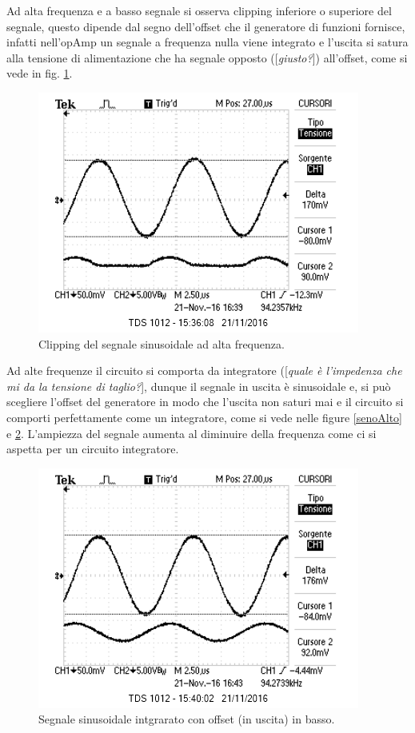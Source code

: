 \documentclass[10pt,a4paper]{article}
\newcommand{\rem}[1]{[\emph{#1}]}
\begin{document}
Ad alta frequenza e a basso segnale si osserva clipping inferiore o superiore del segnale, questo dipende dal segno dell'offset che il generatore di funzioni fornisce, infatti nell'opAmp un segnale a frequenza nulla viene integrato e l'uscita si satura alla tensione di alimentazione che ha segnale opposto (\rem{giusto?}) all'offset, come si vede in fig. \ref{clipping}.\\

\begin{figure}[h]
\centering
\includegraphics[scale=1.0]{immagini/prodottoBandaGuadagno2.png}
\caption{Clipping del segnale sinusoidale ad alta frequenza.}
\label{clipping}
\end{figure}

Ad alte frequenze il circuito si comporta da integratore (\rem{quale è l'impedenza che mi da la tensione di taglio?}, dunque il segnale in uscita è sinusoidale e, si può scegliere l'offset del generatore in modo che l'uscita non saturi mai e il circuito si comporti perfettamente come un integratore, come si vede nelle figure \ref{senoAlto} e \ref{senoBasso}. L'ampiezza del segnale aumenta al diminuire della frequenza come ci si aspetta per un circuito integratore. 

\begin{figure}[h]
\centering
\includegraphics[scale=1.0]{immagini/sinusoidaleinBasso.png}
\caption{Segnale sinusoidale intgrarato con offset (in uscita) in basso.}
\label{senoBasso}
\end{figure}
\end{document}
